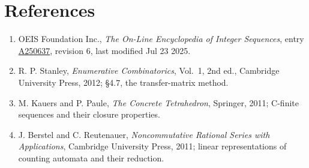 \documentclass[11pt]{article}
\theoremstyle{definition}
\begin{document}
\section{References}

\begin{enumerate}

\item OEIS Foundation Inc., \emph{The On-Line Encyclopedia of Integer Sequences}, entry \href{https://oeis.org/A250637}{A250637}, revision 6, last modified Jul 23 2025.

\item R. P. Stanley, \emph{Enumerative Combinatorics}, Vol.~1, 2nd ed., Cambridge University Press, 2012; \S4.7, the transfer-matrix method.

\item M. Kauers and P. Paule, \emph{The Concrete Tetrahedron}, Springer, 2011; C-finite sequences and their closure properties.

\item J. Berstel and C. Reutenauer, \emph{Noncommutative Rational Series with Applications}, Cambridge University Press, 2011; linear representations of counting automata and their reduction.

\end{enumerate}
\end{document}

